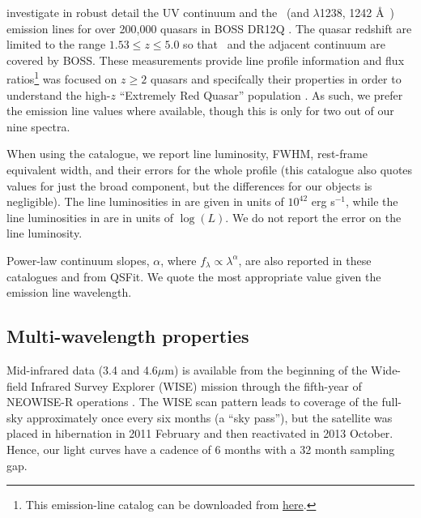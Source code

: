 \documentclass[a4paper,fleqn,usenatbib]{mnras}
\begin{document}
\citet{Hamann2017} investigate in robust detail the UV continuum and
the \civ\ (and \nv $\lambda$1238, 1242 \AA\ ) emission lines for over
200,000 quasars in BOSS DR12Q \citep{Paris2017}.  The quasar redshift
are limited to the range $1.53 \leq z \leq 5.0$ so that \civ\ and the
adjacent continuum are covered by BOSS. These measurements provide
line profile information and flux ratios\footnote{This emission-line
catalog can be downloaded from
\href{https://datadryad.org/stash/dataset/doi:10.6086/D1H59V}{here}.}
\citet{Hamann2017} was focused on $z\geq2$ quasars and specifcally
their \civ properties in order to understand the high-$z$ ``Extremely
Red Quasar'' population \citet{Ross2015, Zakamska2016, Perrotta2019,
  Zakamska2019}.  As such, we prefer the \citet{Hamann2017} emission line
values where available, though this is only for two out of our nine spectra.

When using the \citet{Shen2011} catalogue, we report line luminosity,
FWHM, rest-frame equivalent width, and their errors for the whole
\mgii profile (this catalogue also quotes values for just the broad
\mgii component, but the differences for our objects is
negligible). The line luminosities in \citet{Calderone2017} are given
in units of $10^{42}$ erg s$^{-1}$, while the line luminosities in
\citet{Shen2011} are in units of $\log(L)$.  We do not report the
\citet{Shen2011} error on the line luminosity.

Power-law continuum slopes, $\alpha$, where $f_{\lambda} \propto
\lambda^{\alpha}$, are also reported in these catalogues and from
QSFit.  We quote the most appropriate value given the emission line
wavelength.

\subsection{Multi-wavelength properties}
Mid-infrared data (3.4 and 4.6$\mu$m) is available from the beginning of the
Wide-field Infrared Survey Explorer (WISE) mission \citep[2010
January; ][]{Wright2010} through the fifth-year of NEOWISE-R
operations \citep[2018 December; ][]{Mainzer2011}. The WISE scan
pattern leads to coverage of the full-sky approximately once every six
months (a ``sky pass''), but the satellite was placed in hibernation
in 2011 February and then reactivated in 2013 October. Hence, our
light curves have a cadence of 6 months with a 32 month sampling gap.



\end{document}
